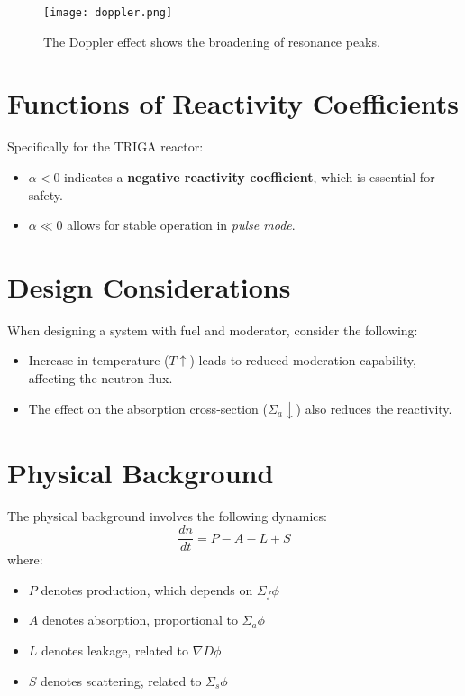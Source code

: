 \begin{figure}[h]
    \centering
        \texttt{[image: doppler.png]}
    \caption{The Doppler effect shows the broadening of resonance peaks.}
\end{figure}

\section{Functions of Reactivity Coefficients}

Specifically for the TRIGA reactor:
\begin{itemize}
    \item $\alpha < 0$ indicates a \textbf{negative reactivity coefficient}, which is essential for safety.
    \item $\alpha \ll 0$ allows for stable operation in \textit{pulse mode}.
\end{itemize}

\section{Design Considerations}

When designing a system with fuel and moderator, consider the following:
\begin{itemize}
    \item Increase in temperature ($T \uparrow$) leads to reduced moderation capability, affecting the neutron flux.
    \item The effect on the absorption cross-section ($\Sigma_a \downarrow$) also reduces the reactivity.
\end{itemize}

\section{Physical Background}

The physical background involves the following dynamics:
\begin{equation}
    \frac{dn}{dt} = P - A - L + S
\end{equation}
where:
\begin{itemize}
    \item $P$ denotes production, which depends on $\Sigma_f \phi$
    \item $A$ denotes absorption, proportional to $\Sigma_a \phi$
    \item $L$ denotes leakage, related to $\nabla D \phi$
    \item $S$ denotes scattering, related to $\Sigma_s \phi$
\end{itemize}

